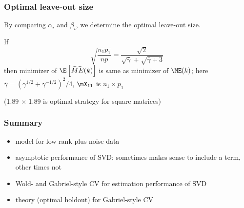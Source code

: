 \documentclass{beamer}
\begin{document}
\begin{frame}
  \frametitle{Optimal leave-out size}
  By comparing $\alpha_i$ and $\beta_i$, we determine the optimal leave-out size.
  \begin{theorem}
    If
    \[
       \sqrt{\frac{n_1 p_1}{n p}}
       =
       \frac{\sqrt{2}}{\sqrt{\bar \gamma} + \sqrt{\bar \gamma + 3}}
    \]
    then minimizer of $\E\left[\widehat{ME}(k)\right]$ is same as minimizer of $\ME(k)$;
    here
    \(
      \bar \gamma = (\gamma^{1/2} + \gamma^{-1/2})^2/4
    \),
    $\mX_{11}$ is $n_1 \times p_1$
  \end{theorem}
  (1.89 $\times$ 1.89 is optimal strategy for square matrices)
\end{frame}

\begin{frame}
  \frametitle{Summary}
  \begin{itemize}
    \item model for low-rank plus noise data
    \item asymptotic performance of SVD; sometimes makes sense to include a term, other times not
    \item Wold- and Gabriel-style CV for estimation performance of SVD
    \item theory (optimal holdout) for Gabriel-style CV 
  \end{itemize}
\end{frame}
\end{document}

